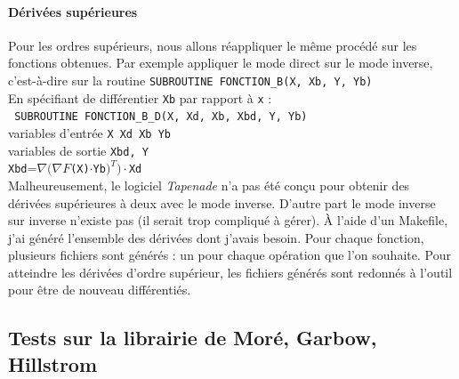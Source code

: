 \paragraph{D\'eriv\'ees sup\'erieures} 
Pour les ordres sup\'erieurs, nous allons r\'eappliquer le même proc\'ed\'e sur les fonctions obtenues. Par exemple appliquer le mode direct sur 
le mode inverse, c'est-\`a-dire sur la routine \verb!SUBROUTINE FONCTION_B(X, Xb, Y, Yb)!\\
En sp\'ecifiant de diff\'erentier {\tt Xb} par rapport \`a {\tt x} : \\
\verb! SUBROUTINE FONCTION_B_D(X, Xd, Xb, Xbd, Y, Yb)!\\
variables d'entr\'ee \verb!X Xd Xb Yb!\\
variables de sortie \verb!Xbd, Y!\\
{\tt Xbd}=$\nabla(\nabla F${\tt (X)}$\cdot${\tt Yb}$)^T)\cdot${\tt Xd}\\



Malheureusement, le logiciel {\it Tapenade} n'a pas \'et\'e conçu pour obtenir des d\'eriv\'ees sup\'erieures \`a deux avec le mode inverse. D'autre
part le mode inverse sur inverse n'existe pas (il serait trop compliqu\'e \`a g\'erer).
\`A l'aide d'un Makefile, j'ai g\'en\'er\'e l'ensemble des d\'eriv\'ees dont j'avais besoin. Pour chaque fonction, 
plusieurs fichiers sont g\'en\'er\'es : un pour chaque op\'eration que l'on souhaite. Pour atteindre les d\'eriv\'ees
d'ordre sup\'erieur, les fichiers g\'en\'er\'es sont redonn\'es \`a l'outil pour être de nouveau diff\'erenti\'es.




% 






    \subsection{Tests sur la librairie de Mor\'e, Garbow, Hillstrom}





